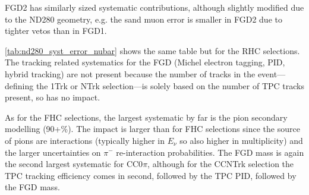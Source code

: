 FGD2 has similarly sized systematic contributions, although slightly modified due to the ND280 geometry, e.g. the sand muon error is smaller in FGD2 due to tighter vetos than in FGD1.

\autoref{tab:nd280_syst_error_nubar} shows the same table but for the RHC selections. The tracking related systematics for the FGD (Michel electron tagging, PID, hybrid tracking) are not present because the number of tracks in the event---defining the 1Trk or NTrk selection---is solely based on the number of TPC tracks present, so has no impact.

As for the FHC selections, the largest systematic by far is the pion secondary modelling (90+\%). The impact is larger than for FHC selections since the source of pions are \numu interactions (typically higher in $E_\nu$ so also higher in multiplicity) and the larger uncertainties on $\pi^-$ re-interaction probabilities. The FGD mass is again the second largest systematic for CC0$\pi$, although for the CCNTrk selection the TPC tracking efficiency comes in second, followed by the TPC PID, followed by the FGD mass.

